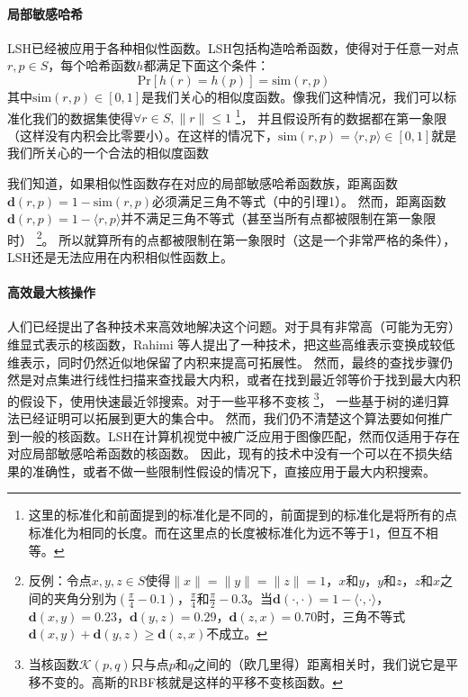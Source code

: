 \documentclass[twocolumn,a4paper]{article}
\begin{document}
\paragraph{局部敏感哈希}LSH已经被应用于各种相似性函数。LSH包括构造哈希函数，使得对于任意一对点$r,p \in S$，每个哈希函数$h$都满足下面这个条件：
\begin{equation}
\mathrm{Pr}[h(r) = h(p)] = \mathrm{sim}(r,p)
\end{equation}
其中$\mathrm{sim}(r,p) \in [0,1]$是我们关心的相似度函数。像我们这种情况，我们可以标准化我们的数据集使得$\forall r \in S, \|r\| \le 1$
\footnote{这里的标准化和前面提到的标准化是不同的，前面提到的标准化是将所有的点标准化为相同的长度。而在这里点的长度被标准化为远不等于1，但互不相等。}，
并且假设所有的数据都在第一象限（这样没有内积会比零要小）。在这样的情况下，$\mathrm{sim}(r,p) = \langle r,p \rangle \in [0,1]$就是我们所关心的一个合法的相似度函数

我们知道，如果相似性函数存在对应的局部敏感哈希函数族，距离函数$\mathbf{d}(r,p) = 1 - \mathrm{sim}(r,p)$必须满足三角不等式（\cite{7}中的引理1）。
然而，距离函数$\mathbf{d}(r, p) = 1 - \langle r,p \rangle$并不满足三角不等式（甚至当所有点都被限制在第一象限时）
\footnote{反例：令点$x,y,z\in S$使得$\|x\|=\|y\|=\|z\|=1$，$x$和$y$，$y$和$z$，$z$和$x$之间的夹角分别为$\left(\frac{\pi}{4} - 0.1\right)$，$\frac{\pi}{4}$和$\frac{\pi}{2} - 0.3$。当$\mathbf{d}(\cdot,\cdot)=1-\langle \cdot,\cdot \rangle$，$\mathbf{d}(x,y) = 0.23$，$\mathbf{d}(y,z)=0.29$，$\mathbf{d}(z,x)=0.70$时，三角不等式$\mathbf{d}(x,y)+\mathbf{d}(y,z)\ge\mathbf{d}(z,x)$不成立。}。
所以就算所有的点都被限制在第一象限时（这是一个非常严格的条件），LSH还是无法应用在内积相似性函数上。

\paragraph{高效最大核操作}人们已经提出了各种技术来高效地解决这个问题。对于具有非常高（可能为无穷）维显式表示的核函数，Rahimi 等人\cite{30}提出了一种技术，把这些高维表示变换成较低维表示，同时仍然近似地保留了内积来提高可拓展性。
然而，最终的查找步骤仍然是对点集进行线性扫描来查找最大内积，或者在找到最近邻等价于找到最大内积的假设下，使用快速最近邻搜索。对于一些平移不变核
\footnote{当核函数$\mathcal{K}(p,q)$只与点$p$和$q$之间的（欧几里得）距离相关时，我们说它是平移不变的。高斯的RBF核就是这样的平移不变核函数。}，
一些基于树的递归算法已经证明可以拓展到更大的集合中\cite{20}。
然而，我们仍不清楚这个算法要如何推广到一般的核函数。LSH在计算机视觉中被广泛应用于图像匹配\cite{23}，然而仅适用于存在对应局部敏感哈希函数的核函数\cite{7}。
因此，现有的技术中没有一个可以在不损失结果的准确性，或者不做一些限制性假设的情况下，直接应用于最大内积搜索。
\end{document}
